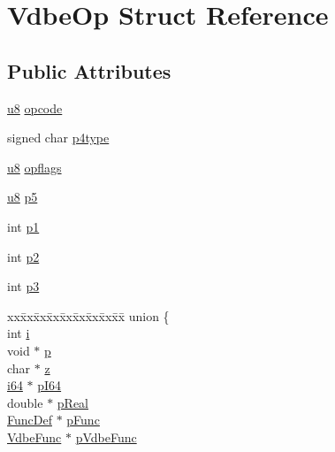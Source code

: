 \hypertarget{struct_vdbe_op}{\section{Vdbe\-Op Struct Reference}
\label{struct_vdbe_op}
}
\subsection*{Public Attributes}
\begin{DoxyCompactItemize}
\item 
\hyperlink{sqlite3_8c_a74a0f6424ae628af25f23f0a35f6ead3}{u8} \hyperlink{struct_vdbe_op_ae12a8e7a8f5f7ba39fa379c9ad287837}{opcode}
\item 
signed char \hyperlink{struct_vdbe_op_a124dee58d3e0d73c7dfaf811a3311023}{p4type}
\item 
\hyperlink{sqlite3_8c_a74a0f6424ae628af25f23f0a35f6ead3}{u8} \hyperlink{struct_vdbe_op_a169a7bbe99a90c26ee01833723750b1d}{opflags}
\item 
\hyperlink{sqlite3_8c_a74a0f6424ae628af25f23f0a35f6ead3}{u8} \hyperlink{struct_vdbe_op_a5e807981f52d29c06a5b6d4a8f2f4595}{p5}
\item 
int \hyperlink{struct_vdbe_op_a17c8326a1e3ac5612d4aaaa88f383b3b}{p1}
\item 
int \hyperlink{struct_vdbe_op_aba021fa9d30343c16794d9b76d8bffcd}{p2}
\item 
int \hyperlink{struct_vdbe_op_ad7ef3319da20d5423b8cc5da6995d193}{p3}
\item 
\begin{tabbing}
xx\=xx\=xx\=xx\=xx\=xx\=xx\=xx\=xx\=\kill
union \{\\
\>int \hyperlink{struct_vdbe_op_a69efeafb8cb87ea2a6feed61e877869a}{i}\\
\>void $\ast$ \hyperlink{struct_vdbe_op_a27a7eaab2fd6a79638f134576847f446}{p}\\
\>char $\ast$ \hyperlink{struct_vdbe_op_aa9221aa6dd0a193b1760e4ecfc7376a7}{z}\\
\>\hyperlink{sqlite3_8c_a2a0f0f4ae7001eb54351f77ea1cdbcfd}{i64} $\ast$ \hyperlink{struct_vdbe_op_aca64f9003a7490b02e08d790a7680fc3}{pI64}\\
\>double $\ast$ \hyperlink{struct_vdbe_op_a627ba5846cb35734a01493acd010a9a0}{pReal}\\
\>\hyperlink{struct_func_def}{FuncDef} $\ast$ \hyperlink{struct_vdbe_op_a041e9019dd14f775e7dc639e35127d39}{pFunc}\\
\>\hyperlink{struct_vdbe_func}{VdbeFunc} $\ast$ \hyperlink{struct_vdbe_op_a4091014dd0f37dfb31fb6e75f42f06ec}{pVdbeFunc}\\

\end{tabbing}
\end{DoxyCompactItemize}

